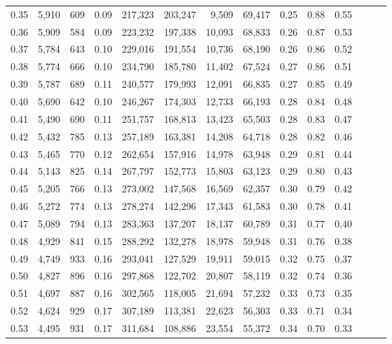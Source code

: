 \begin{tabular}{rrrrrrrrrrrrrr}
0.35 &  5,910 &    609 &  0.09 &  217,323 &  203,247 &   9,509 &  69,417 &  0.25 &  0.88 &      0.55 \\
0.36 &  5,909 &    584 &  0.09 &  223,232 &  197,338 &  10,093 &  68,833 &  0.26 &  0.87 &      0.53 \\
0.37 &  5,784 &    643 &  0.10 &  229,016 &  191,554 &  10,736 &  68,190 &  0.26 &  0.86 &      0.52 \\
0.38 &  5,774 &    666 &  0.10 &  234,790 &  185,780 &  11,402 &  67,524 &  0.27 &  0.86 &      0.51 \\
0.39 &  5,787 &    689 &  0.11 &  240,577 &  179,993 &  12,091 &  66,835 &  0.27 &  0.85 &      0.49 \\
0.40 &  5,690 &    642 &  0.10 &  246,267 &  174,303 &  12,733 &  66,193 &  0.28 &  0.84 &      0.48 \\
0.41 &  5,490 &    690 &  0.11 &  251,757 &  168,813 &  13,423 &  65,503 &  0.28 &  0.83 &      0.47 \\
0.42 &  5,432 &    785 &  0.13 &  257,189 &  163,381 &  14,208 &  64,718 &  0.28 &  0.82 &      0.46 \\
0.43 &  5,465 &    770 &  0.12 &  262,654 &  157,916 &  14,978 &  63,948 &  0.29 &  0.81 &      0.44 \\
0.44 &  5,143 &    825 &  0.14 &  267,797 &  152,773 &  15,803 &  63,123 &  0.29 &  0.80 &      0.43 \\
0.45 &  5,205 &    766 &  0.13 &  273,002 &  147,568 &  16,569 &  62,357 &  0.30 &  0.79 &      0.42 \\
0.46 &  5,272 &    774 &  0.13 &  278,274 &  142,296 &  17,343 &  61,583 &  0.30 &  0.78 &      0.41 \\
0.47 &  5,089 &    794 &  0.13 &  283,363 &  137,207 &  18,137 &  60,789 &  0.31 &  0.77 &      0.40 \\
0.48 &  4,929 &    841 &  0.15 &  288,292 &  132,278 &  18,978 &  59,948 &  0.31 &  0.76 &      0.38 \\
0.49 &  4,749 &    933 &  0.16 &  293,041 &  127,529 &  19,911 &  59,015 &  0.32 &  0.75 &      0.37 \\
0.50 &  4,827 &    896 &  0.16 &  297,868 &  122,702 &  20,807 &  58,119 &  0.32 &  0.74 &      0.36 \\
0.51 &  4,697 &    887 &  0.16 &  302,565 &  118,005 &  21,694 &  57,232 &  0.33 &  0.73 &      0.35 \\
0.52 &  4,624 &    929 &  0.17 &  307,189 &  113,381 &  22,623 &  56,303 &  0.33 &  0.71 &      0.34 \\
0.53 &  4,495 &    931 &  0.17 &  311,684 &  108,886 &  23,554 &  55,372 &  0.34 &  0.70 &      0.33 \\

\end{tabular}
